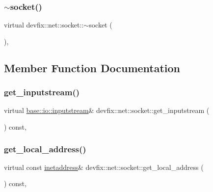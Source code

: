 \subsubsection{\texorpdfstring{$\sim$socket()}{~socket()}}
{\footnotesize\ttfamily virtual devfix\+::net\+::socket\+::$\sim$socket (\begin{DoxyParamCaption}{ }\end{DoxyParamCaption})\hspace{0.3cm}{\ttfamily [virtual]}, {\ttfamily [default]}}



\subsection{Member Function Documentation}
\mbox{\label{structdevfix_1_1net_1_1socket_a3a00115497ccb83e8497a7e33be06b03}} 
\subsubsection{\texorpdfstring{get\+\_\+inputstream()}{get\_inputstream()}}
{\footnotesize\ttfamily virtual \hyperlink{structdevfix_1_1base_1_1io_1_1inputstream}{base\+::io\+::inputstream}\& devfix\+::net\+::socket\+::get\+\_\+inputstream (\begin{DoxyParamCaption}{ }\end{DoxyParamCaption}) const\hspace{0.3cm}{\ttfamily [pure virtual]}, {\ttfamily [noexcept]}}

\mbox{\label{structdevfix_1_1net_1_1socket_a570b728ca81a3d47ca7733ff21063318}} 
\subsubsection{\texorpdfstring{get\+\_\+local\+\_\+address()}{get\_local\_address()}}
{\footnotesize\ttfamily virtual const \hyperlink{structdevfix_1_1net_1_1inetaddress}{inetaddress}\& devfix\+::net\+::socket\+::get\+\_\+local\+\_\+address (\begin{DoxyParamCaption}{ }\end{DoxyParamCaption}) const\hspace{0.3cm}{\ttfamily [pure virtual]}, {\ttfamily [noexcept]}}

